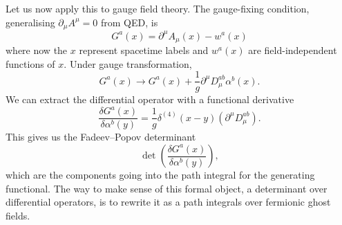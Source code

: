 Let us now apply this to gauge field theory. The gauge-fixing condition, generalising $\partial_{\mu} A^{\mu} = 0$ from QED, is
\begin{equation}
  G^{a}(x) = \partial^{\mu} A_{\mu}(x) - w^{a}(x)
\end{equation}
where now the $x$ represent spacetime labels and $w^{a}(x)$ are field-independent functions of $x$.
Under gauge transformation,
\begin{equation}
  G^{a}(x) \to G^{a}(x) + \frac{1}{g} \partial^{\mu} D^{ab}_{\mu} \alpha^{b}(x).
\end{equation}
We can extract the differential operator with a functional derivative
\begin{equation}
  \frac{\delta G^{a}(x)}{\delta \alpha^{b}(y)} = \frac{1}{g} \delta^{(4)}(x - y) (\partial^{\mu} D_{\mu}^{ab}).
\end{equation}
This gives us the Fadeev--Popov determinant
\begin{equation}
  \det( \frac{\delta G^{a}(x)}{\delta \alpha^{b}(y)} ),
\end{equation}
which are the components going into the path integral for the generating functional.
The way to make sense of this formal object, a determinant over differential operators, is to rewrite it as a path integrals over fermionic ghost fields.

